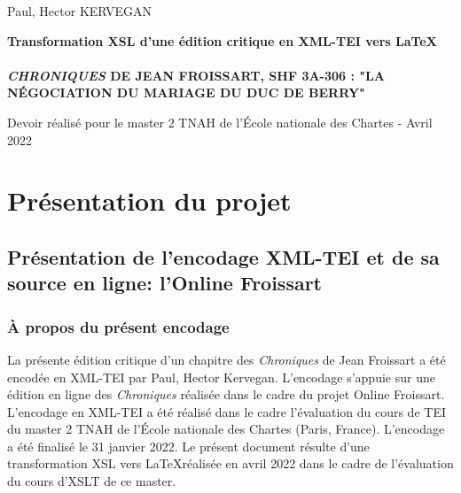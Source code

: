 \documentclass[12pt, a4paper]{article}
\begin{document}
	
	
	\begin{titlepage}
		\begin{center}
			\large
			Paul, Hector KERVEGAN
			
			\Large
			\vfill
			\textbf{Transformation XSL d'une édition critique en XML-TEI vers \LaTeX}
			\\~\\
			\textbf{\textit{CHRONIQUES} DE JEAN FROISSART, SHF 3A-306 : "LA NÉGOCIATION DU MARIAGE DU DUC DE BERRY"}
			\vfill
			
			\large	
			\vfill Devoir réalisé pour le master 2 TNAH de l'École nationale des Chartes - Avril 2022
		\end{center}
	\end{titlepage}
	
	
	
	\section{Présentation du projet}
	\subsection{Présentation de l'encodage XML-TEI et de sa source en ligne: l'Online Froissart}
	
	
	
	\subsubsection{À propos du présent encodage}
	La présente édition critique d'un chapitre des \textit{Chroniques} de Jean Froissart a été encodée en XML-TEI par Paul, Hector Kervegan. L'encodage s'appuie sur une édition en ligne des \textit{Chroniques} 
	réalisée dans le cadre du projet Online Froissart.\\ \indent L'encodage en XML-TEI a été 
	réalisé dans le cadre l'évaluation du cours de TEI du master 2 TNAH de l'École nationale des Chartes (Paris, France). L'encodage a été finalisé le 31 janvier 2022. Le présent document résulte d'une transformation XSL vers \LaTeX  réalisée
	en avril 2022 dans le cadre de l'évaluation du cours d'XSLT de ce master.
	
	
\end{document}
